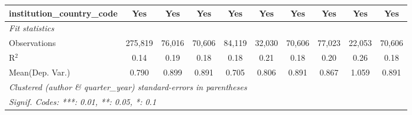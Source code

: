 \begin{tabular}{lccccccccc}
   institution\_country\_code             & Yes           & Yes           & Yes           & Yes           & Yes           & Yes           & Yes           & Yes          & Yes\\  
   \midrule
   \emph{Fit statistics}\\
   Observations                           & 275,819       & 76,016        & 70,606        & 84,119        & 32,030        & 70,606        & 77,023        & 22,053       & 70,606\\  
   R$^2$                                  & 0.14          & 0.19          & 0.18          & 0.18          & 0.21          & 0.18          & 0.20          & 0.26         & 0.18\\  
Mean(Dep. Var.) & 0.790 & 0.899 & 0.891 & 0.705 & 0.806 & 0.891 & 0.867 & 1.059 & 0.891 \\
   \midrule \midrule
   \multicolumn{10}{l}{\emph{Clustered (author \& quarter\_year) standard-errors in parentheses}}\\
   \multicolumn{10}{l}{\emph{Signif. Codes: ***: 0.01, **: 0.05, *: 0.1}}\\
\end{tabular}
\par\endgroup
